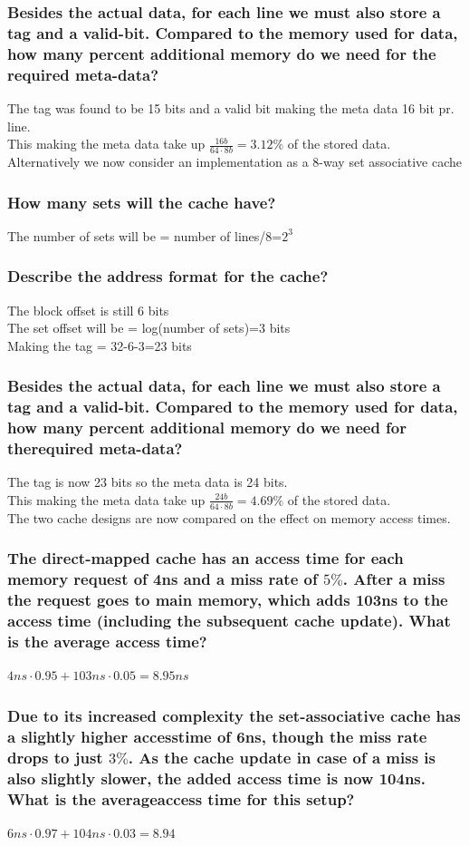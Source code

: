 \documentclass[12pt, a4paper]{article}
\begin{document}
			\subsubsection{Besides the actual data, for each line we must also store a tag and a valid-bit. Compared to the memory used for data, how many percent additional memory do we need for the required meta-data?}
				The tag was found to be 15 bits and a valid bit making the meta data 16 bit pr. line.\\
				This making the meta data take up $\frac{16b}{64\cdot 8b}=3.12\%$ of the stored data.\\[4mm]
			Alternatively we now consider an implementation as a 8-way set associative cache
			\subsubsection{How many sets will the cache have?}
				The number of sets will be = number of lines/8=$2^3$
			\subsubsection{Describe the address format for the cache?}
				The block offset is still 6 bits\\
				The set offset will be = log(number of sets)=3 bits\\
				Making the tag = 32-6-3=23 bits
			\subsubsection{Besides the actual data, for each line we must also store a tag and a valid-bit. Compared to the memory used for data, how many percent additional memory do we need for therequired meta-data?}
				The tag is now 23 bits so the meta data is 24 bits.\\
				This making the meta data take up $\frac{24b}{64\cdot 8b}=4.69\%$ of the stored data.\\[4mm]
			The two cache designs are now compared on the effect on memory access times.
			\subsubsection{The direct-mapped cache has an access time for each memory request of 4ns and a miss rate of $5\%$. After a miss the request goes to main memory, which adds 103ns to the access time (including the subsequent cache update). What is the average access time?}
				$4ns\cdot 0.95+103ns\cdot 0.05=8.95ns$
			\subsubsection{Due to its increased complexity the set-associative cache has a slightly higher accesstime of 6ns, though the miss rate drops to just $3\%$. As the cache update in case of a miss is also slightly slower, the added access time is now 104ns. What is the averageaccess time for this setup?}
				$6ns \cdot 0.97+104ns\cdot 0.03=8.94$
\end{document}
